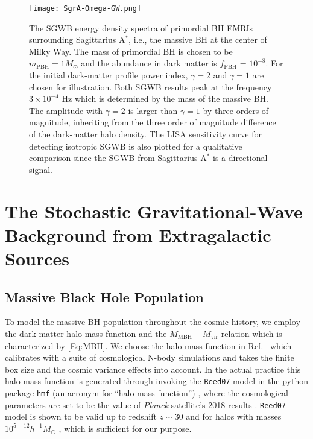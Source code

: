   \begin{figure}[htbp] %
   \centering
   \texttt{[image: SgrA-Omega-GW.png]} 
   \caption{The \ac{SGWB} energy density spectra of primordial \ac{BH} \acp{EMRI} surrounding Sagittarius A$^\ast$, i.e., the massive \ac{BH} at the center of Milky Way. 
   The mass of primordial \ac{BH} is chosen to be $m_\mathrm{PBH} = 1 M_\odot$ and the abundance in dark matter is $f_\mathrm{PBH}$ = $10^{-8}$.
   For the initial dark-matter profile power index, $\gamma=2$ and $\gamma=1$ are chosen for illustration.
   Both \ac{SGWB} results peak at the frequency $3\times 10^{-4}$ Hz which is determined by the mass of the massive \ac{BH}.
   The amplitude with $\gamma=2$ is larger than  $\gamma=1$ by three orders of magnitude, inheriting from the three order of magnitude difference of the dark-matter halo density.
   The LISA sensitivity curve for detecting isotropic \ac{SGWB} is also plotted for a qualitative comparison since the \ac{SGWB} from Sagittarius A$^\ast$ is a directional signal.}
   \label{fig:SgrA-Omega-GW}
\end{figure}

\section{The Stochastic Gravitational-Wave Background from Extragalactic Sources} \label{sec:extragalactic}

\subsection{Massive Black Hole Population}

To model the massive \ac{BH} population throughout the cosmic history, we employ the dark-matter halo mass function and the $M_\text{MBH}-M_\text{vir}$ relation which is characterized by \cref{Eq:MBH}.
We choose the halo mass function in Ref.~\cite{Reed:2006rw} which calibrates with a suite of cosmological N-body simulations and takes the finite box size and the cosmic variance effects into account. 
In the actual practice this halo mass function  is generated through invoking the \texttt{Reed07} model in the python package \texttt{hmf} (an acronym for ``halo mass function'') \cite{Murray:2013qza}, where the cosmological parameters are set to be the value of \textit{Planck} satellite's 2018 results \cite{Planck2018}.
\texttt{Reed07} model is shown to be valid up to redshift $z\sim30$ and for halos with masses $10^{5-12} h^{-1}M_\odot$ \cite{Reed:2006rw}, which is sufficient for our purpose. 

